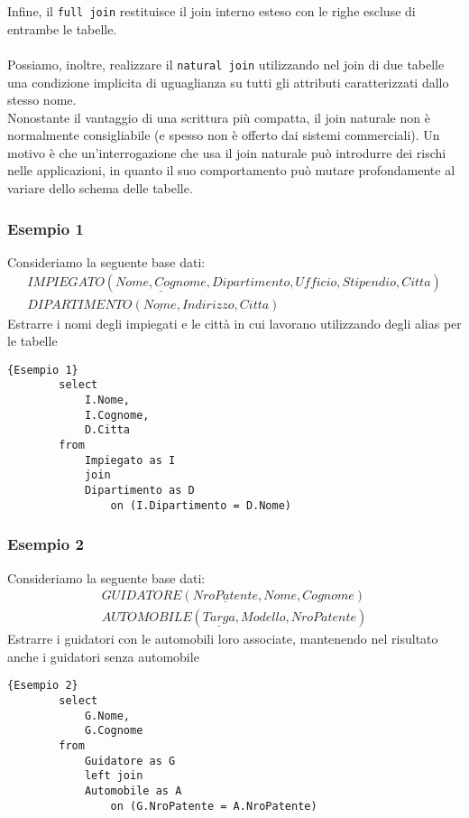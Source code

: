 Infine, il \texttt{full join} restituisce il join interno esteso con le righe escluse di entrambe le tabelle.\\\\
Possiamo, inoltre, realizzare il \texttt{natural join} utilizzando nel join di due tabelle una condizione implicita di uguaglianza su tutti gli attributi caratterizzati dallo stesso nome.\\
Nonostante il vantaggio di una scrittura più compatta, il join naturale non è normalmente consigliabile (e spesso non è offerto dai sistemi commerciali). Un motivo è che un'interrogazione che usa il join naturale può introdurre dei rischi nelle applicazioni, in quanto il suo comportamento può mutare profondamente al variare dello schema delle tabelle.

\subsubsection{Esempio 1}
Consideriamo la seguente base dati:
    \begin{equation}\begin{aligned}
        IMPIEGATO (\underline{Nome, Cognome}, Dipartimento, Ufficio, Stipendio, Citta)\\
        DIPARTIMENTO (\underline{Nome}, Indirizzo, Citta)
    \end{aligned}\end{equation}
Estrarre i nomi degli impiegati e le città in cui lavorano utilizzando degli alias per le tabelle
    \begin{lstlisting}{Esempio 1}
        select 
            I.Nome, 
            I.Cognome, 
            D.Citta
        from 
            Impiegato as I
            join 
            Dipartimento as D
                on (I.Dipartimento = D.Nome)
    \end{lstlisting}
    
\subsubsection{Esempio 2}
Consideriamo la seguente base dati:
    \begin{equation}\begin{aligned}
        GUIDATORE (\underline{NroPatente}, Nome, Cognome)\\
        AUTOMOBILE (\underline{Targa}, Modello, NroPatente)
    \end{aligned}\end{equation}
Estrarre i guidatori con le automobili loro associate, mantenendo nel risultato anche i guidatori senza automobile
    \begin{lstlisting}{Esempio 2}
        select 
            G.Nome,
            G.Cognome
        from 
            Guidatore as G
            left join 
            Automobile as A
                on (G.NroPatente = A.NroPatente)
    \end{lstlisting}

